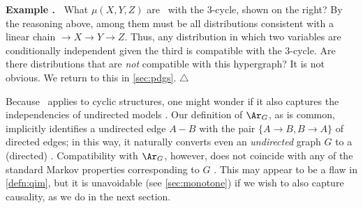 \newlength{\cycleboxlen}
\newsavebox\cyclebox
\sbox{}
\settowidth{\cycleboxlen}{\usebox{\cyclebox}}
\addtolength{\cycleboxlen}{1em}
\begin{wrapfigure}[4]{o}{\cycleboxlen}
    \vspace{-0.8em}
    \hfill
    \usebox\cyclebox
\end{wrapfigure}
\label{example:xyz-cycle-1}
\textbf{Example {\theexample}.~} 
    What $\mu(X,Y,Z)$ are \cible\ with the 3-cycle, shown on the right?
    By the reasoning above,
     among them must be all distributions consistent with a linear chain ${\to}X{\to}Y{\to}Z$. Thus,  
    any distribution in which two variables are conditionally independent given the third is compatible with the 3-cycle.
    Are there
    distributions that are \emph{not} compatible with 
    this hypergraph? It is not obvious. We return to this
     in \cref{sec:pdgs}. 
\hfill$\triangle$



Because \scibility\ applies to cyclic structures,  one might wonder if
    it also captures the independencies of undirected models 
    \unskip.
Our definition of $\Ar_G$, as is common, implicitly identifies a undirected edge $A {-} B$ with the pair $\{ A{\to}B, B{\to}A\}$ of directed edges;
in this way, it naturally converts even an \emph{undirected} graph $G$ to a (directed) \hgraph. 
Compatibility with $\Ar_G$, however, does not coincide with any of the standard Markov properties
corresponding to $G$ \citep{koller2009probabilistic}.
This may appear to be a flaw in \cref{defn:qim},
but it is unavoidable (see \cref{sec:monotone}) if we wish to also capture causality, as we do in the next section. 


